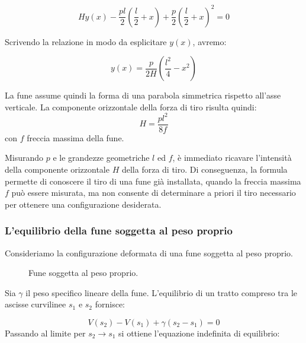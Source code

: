 \begin{equation}
   H y(x) -  \frac{pl}{2}\left( \frac{l}{2} + x \right) + \frac{p}{2}\left( \frac{l}{2} + x \right)^{2} = 0
\end{equation}

Scrivendo la relazione in modo da esplicitare $y(x)$, avremo: 

\begin{equation}
   y(x) = \frac{p}{2H} \left( \frac{l^{2}}{4} - x^{2} \right) 
\end{equation}

La fune assume quindi la forma di una parabola simmetrica rispetto all'asse verticale. 
La componente orizzontale della forza di tiro risulta quindi:
\begin{equation}
   H = \frac{pl^{2}}{8f}
   \label{eq:equazione_tiro}
\end{equation}
con $f$ freccia massima della fune.

Misurando $p$ e le grandezze geometriche $l$ ed $f$, è immediato ricavare l'intensità della componente orizzontale $H$ della forza di tiro. Di conseguenza, la formula permette di conoscere il tiro di una fune già installata, quando la freccia massima $f$ può essere misurata, ma non consente di determinare a priori il tiro necessario per ottenere una configurazione desiderata. 

\subsubsection{L'equilibrio della fune soggetta al peso proprio}
Consideriamo la configurazione deformata di una fune soggetta al peso proprio.

\begin{figure}[htbp]
    \centering
    
    \caption{Fune soggetta al peso proprio.}
    \label{fig:fune_catenaria}
\end{figure}
Sia $\gamma$ il peso specifico lineare della fune. L'equilibrio di un tratto compreso tra le ascisse curvilinee $s_1$ e $s_2$ fornisce: 

\begin{equation}
   V(s_2)-V(s_1) + \gamma(s_2 - s_1) = 0
\end{equation}
Passando al limite per $s_2 \rightarrow s_1$ si ottiene l'equazione indefinita di equilibrio: 

